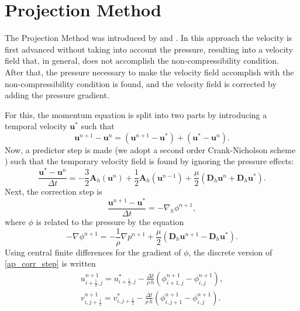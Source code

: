 \section{Projection Method}
The Projection Method was introduced by \textcite{chorin1968} and \textcite{yanenko1971}. In this approach the velocity is first advanced without taking into account the pressure, resulting into a velocity field that, in general, does not accomplish the non-compressibility condition. After that, the pressure necessary to make the velocity field accomplish with the non-compressibility condition is found, and the velocity field is corrected by adding the pressure gradient.

For this, the momentum equation is split into two parts by introducing a temporal velocity $\mathbf{u}^*$ such that $$\mathbf{u}^{n+1}-\mathbf{u}^n=\left(\mathbf{u}^{n+1}-\mathbf{u}^*\right)+\left(\mathbf{u}^*-\mathbf{u}^n\right).$$
Now, a predictor step is made (we adopt a second order Crank-Nicholson scheme \cite{leveque2007}) such that the temporary velocity field is found by ignoring the pressure effects:
\begin{equation}\label{eq:ap_crank_nich}
\frac{\mathbf{u}^*-\mathbf{u}^n}{\Delta t}=-\frac{3}{2}\mathbf{A}_h\left(\mathbf{u}^n\right)+\frac{1}{2}\mathbf{A}_h\left(\mathbf{u}^{n-1}\right)+\frac{\mu}{2}\left(\mathbf{D}_h\mathbf{u}^n+\mathbf{D}_h\mathbf{u}^*\right).
\end{equation}
Next, the correction step is
\begin{equation}
\frac{\mathbf{u}^{n+1}-\mathbf{u}^*}{\Delta t}=-\nabla_h\phi^{n+1},\label{eq:ap_corr_step}
\end{equation}
where $\phi$ is related to the pressure by the equation
\begin{equation}
-\nabla\phi^{n+1}=-\frac{1}{\rho}\nabla p^{n+1}+\frac{\mu}{2}\left(\mathbf{D}_h\mathbf{u}^{n+1}-\mathbf{D}_h\mathbf{u}^*\right).\label{eq:ap_phi_pressure}
\end{equation}
Using central finite differences for the gradient of $\phi$, the discrete version of \eqref{ap_corr_step} is written
\begin{align}
u_{i+\frac{1}{2},j}^{n+1}=u_{i+\frac{1}{2},j}^{*}-\frac{\Delta t}{\rho\,h}\left(\phi_{i+1,j}^{n+1}-\phi_{i,j}^{n+1}\right),\label{eq:ap_corr_step_discr_u}\\
v_{i,j+\frac{1}{2}}^{n+1}=v_{i,j+\frac{1}{2}}^{*}-\frac{\Delta t}{\rho\,h}\left(\phi_{i,j+1}^{n+1}-\phi_{i,j}^{n+1}\right).
\label{eq:ap_corr_step_discr_v}
\end{align}
